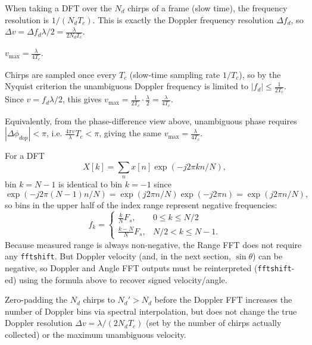 When taking a DFT over the $N_d$ chirps of a frame (slow time), the frequency resolution is $1/(N_dT_c)$. This is exactly the Doppler frequency resolution $\Delta f_d$, so $\Delta v = \Delta f_d \lambda/2 = \frac{\lambda}{2N_dT_c}$.

\begin{definition}
$v_{\max} = \frac{\lambda}{4T_c}$.
\end{definition}
Chirps are sampled once every $T_c$ (slow-time sampling rate $1/T_c$), so by the Nyquist criterion the unambiguous Doppler frequency is limited to $|f_d| \leq \frac{1}{2T_c}$. Since $v = f_d\lambda/2$, this gives $v_{\max} = \frac{1}{2T_c}\cdot\frac{\lambda}{2} = \frac{\lambda}{4T_c}$.

\begin{remark}
Equivalently, from the phase-difference view above, unambiguous phase requires $|\Delta\phi_{dop}| < \pi$, i.e. $\frac{4\pi v}{\lambda}T_c < \pi$, giving the same $v_{\max} = \frac{\lambda}{4T_c}$.
\end{remark}

\begin{remark}
For a DFT
$$X[k] = \sum_n x[n]\exp(-j2\pi kn/N),$$
bin $k = N-1$ is identical to bin $k=-1$ since
$$\exp(-j2\pi(N-1)n/N) = \exp(j2\pi n/N)\exp(-j2\pi n) = \exp(j2\pi n/N),$$
so bins in the upper half of the index range represent negative frequencies:
$$f_k = \begin{cases} \frac{k}{N}F_s, & 0 \leq k \leq N/2 \\ \frac{k-N}{N}F_s, & N/2 < k \leq N-1. \end{cases}$$
Because measured range is always non-negative, the Range FFT does not require any \texttt{fftshift}. But Doppler velocity (and, in the next section, $\sin\theta$) can be negative, so Doppler and Angle FFT outputs must be reinterpreted (\lstinline{fftshift}-ed) using the formula above to recover signed velocity/angle.
\end{remark}

\begin{remark}[Padding]
Zero-padding the $N_d$ chirps to $N_d' > N_d$ before the Doppler FFT increases the number of Doppler bins via spectral interpolation, but does not change the true Doppler resolution $\Delta v = \lambda/(2N_dT_c)$ (set by the number of chirps actually collected) or the maximum unambiguous velocity.
\end{remark}

